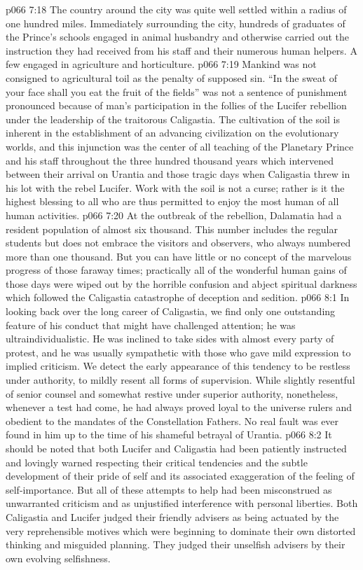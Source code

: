 \pc \vs p066 7:18 The country around the city was quite well settled within a radius of one hundred miles. Immediately surrounding the city, hundreds of graduates of the Prince’s schools engaged in animal husbandry and otherwise carried out the instruction they had received from his staff and their numerous human helpers. A few engaged in agriculture and horticulture.
\vs p066 7:19 Mankind was not consigned to agricultural toil as the penalty of supposed sin. “In the sweat of your face shall you eat the fruit of the fields” was not a sentence of punishment pronounced because of man’s participation in the follies of the Lucifer rebellion under the leadership of the traitorous Caligastia. The cultivation of the soil is inherent in the establishment of an advancing civilization on the evolutionary worlds, and this injunction was the center of all teaching of the Planetary Prince and his staff throughout the three hundred thousand years which intervened between their arrival on Urantia and those tragic days when Caligastia threw in his lot with the rebel Lucifer. Work with the soil is not a curse; rather is it the highest blessing to all who are thus permitted to enjoy the most human of all human activities.
\vs p066 7:20 At the outbreak of the rebellion, Dalamatia had a resident population of almost six thousand. This number includes the regular students but does not embrace the visitors and observers, who always numbered more than one thousand. But you can have little or no concept of the marvelous progress of those faraway times; practically all of the wonderful human gains of those days were wiped out by the horrible confusion and abject spiritual darkness which followed the Caligastia catastrophe of deception and sedition.
\vs p066 8:1 In looking back over the long career of Caligastia, we find only one outstanding feature of his conduct that might have challenged attention; he was ultraindividualistic. He was inclined to take sides with almost every party of protest, and he was usually sympathetic with those who gave mild expression to implied criticism. We detect the early appearance of this tendency to be restless under authority, to mildly resent all forms of supervision. While slightly resentful of senior counsel and somewhat restive under superior authority, nonetheless, whenever a test had come, he had always proved loyal to the universe rulers and obedient to the mandates of the Constellation Fathers. No real fault was ever found in him up to the time of his shameful betrayal of Urantia.
\vs p066 8:2 It should be noted that both Lucifer and Caligastia had been patiently instructed and lovingly warned respecting their critical tendencies and the subtle development of their pride of self and its associated exaggeration of the feeling of self\hyp{}importance. But all of these attempts to help had been misconstrued as unwarranted criticism and as unjustified interference with personal liberties. Both Caligastia and Lucifer judged their friendly advisers as being actuated by the very reprehensible motives which were beginning to dominate their own distorted thinking and misguided planning. They judged their unselfish advisers by their own evolving selfishness.
